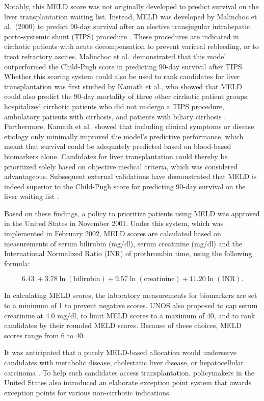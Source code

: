 \documentclass[11pt,twoside,]{book}
\begin{document}
Notably, this MELD score was not originally developed to predict survival on the
liver transplantation waiting list. Instead, MELD was developed by Malinchoc et al.~(2000)
to predict 90-day survival after an elective transjugular intrahepatic porto-systemic
shunt (TIPS) procedure \citep{malinchocModelPredictPoor2000}. These procedures are
indicated in cirrhotic patients with acute decompensation to prevent variceal
rebleeding, or to treat refractory ascites. Malinchoc et al.~demonstrated that
this model outperformed the Child-Pugh score in predicting 90-day survival after TIPS.
\newpage
Whether this scoring system could also be used to rank candidates for liver
transplantation was first studied by Kamath et al.,
who showed that MELD could also predict the 90-day mortality of three
other cirrhotic patient groups: hospitalized cirrhotic
patients who did not undergo a TIPS procedure, ambulatory patients with cirrhosis,
and patients with biliary cirrhosis \citep{kamathModelPredictSurvival2001}.
Furthermore, Kamath et al.~showed that
including clinical symptoms or disease etiology only minimally improved the model's
predictive performance, which meant that survival could be
adequately predicted based on blood-based biomarkers alone. Candidates for
liver transplantation could thereby be prioritized solely based on objective
medical criteria, which was considered advantageous. Subsequent external validations have
demonstrated that MELD is indeed superior to the Child-Pugh score for predicting
90-day survival on the liver waiting list
\citep{wiesnerModelEndstageLiver2003}.

Based on these findings, a policy to prioritize patients using MELD was approved
in the United States in November 2001. Under this system, which was implemented
in February 2002, MELD scores are calculated based on measurements of
serum bilirubin (mg/dl),
serum creatinine (mg/dl) and the International Normalized Ratio (INR)
of prothrombin time, using the following formula:

\[6.43\  + 3.78\ln\left( \text{bilirubin} \right) + 9.57\ln\left( \text{creatinine} \right) + 11.20\ln\left(\text{INR}\right).\]

In calculating MELD scores, the laboratory measurements for biomarkers are set to
a minimum of 1 to prevent negative scores. UNOS also proposed to cap
serum creatinine at 4.0 mg/dl, to limit MELD scores to a maximum of 40, and to
rank candidates by their rounded MELD scores. Because of these choices, MELD
scores range from 6 to 40.

It was anticipated that a purely MELD-based allocation would underserve
candidates with metabolic disease, cholestatic liver disease, or hepatocellular carcinoma
\citep{kamathModelPredictSurvival2001, wiesnerModelEndstageLiver2003}.
To help such candidates access transplantation, policymakers in the United States
also introduced an elaborate exception point system that awards exception points
for various non-cirrhotic indications.
\end{document}
